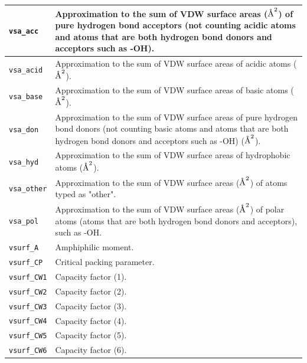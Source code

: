 \documentclass[12pt,a4paper]{article}
\newcommand{\angstrom}{\mbox{\normalfont\AA}}
\begin{document}
\begin{longtable}{@{\zz}|p{}|p{}|}
\texttt{vsa\_acc} & Approximation to the sum of VDW surface areas 
($\angstrom^2$) of pure hydrogen bond acceptors (not counting acidic 
atoms and atoms that are both hydrogen bond donors and acceptors such as 
-OH).\\ \hline

\texttt{vsa\_acid} & Approximation to the sum of VDW surface areas of 
acidic atoms ($\angstrom^2$).\\ \hline

\texttt{vsa\_base} & Approximation to the sum of VDW surface areas of 
basic atoms ($\angstrom^2$).\\ \hline

\texttt{vsa\_don} & Approximation to the sum of VDW surface areas of 
pure hydrogen bond donors (not counting basic atoms and atoms that are 
both hydrogen bond donors and acceptors such as -OH) ($\angstrom^2$).\\ \hline

\texttt{vsa\_hyd} & Approximation to the sum of VDW surface areas of 
hydrophobic atoms ($\angstrom^2$).\\ \hline

\texttt{vsa\_other} & Approximation to the sum of VDW surface areas 
($\angstrom^2$) of atoms typed as "other".\\ \hline

\texttt{vsa\_pol} & Approximation to the sum of VDW surface areas 
($\angstrom^2$) of polar atoms (atoms that are both hydrogen bond 
donors and acceptors), such as -OH.\\ \hline

\texttt{vsurf\_A} & Amphiphilic moment.\\ \hline

\texttt{vsurf\_CP} & Critical packing parameter.\\ \hline

\texttt{vsurf\_CW1} & Capacity factor (1).\\ \hline

\texttt{vsurf\_CW2} & Capacity factor (2).\\ \hline

\texttt{vsurf\_CW3} & Capacity factor (3).\\ \hline

\texttt{vsurf\_CW4} & Capacity factor (4).\\ \hline

\texttt{vsurf\_CW5} & Capacity factor (5).\\ \hline

\texttt{vsurf\_CW6} & Capacity factor (6).\\ \hline


\end{longtable}
\end{document}
